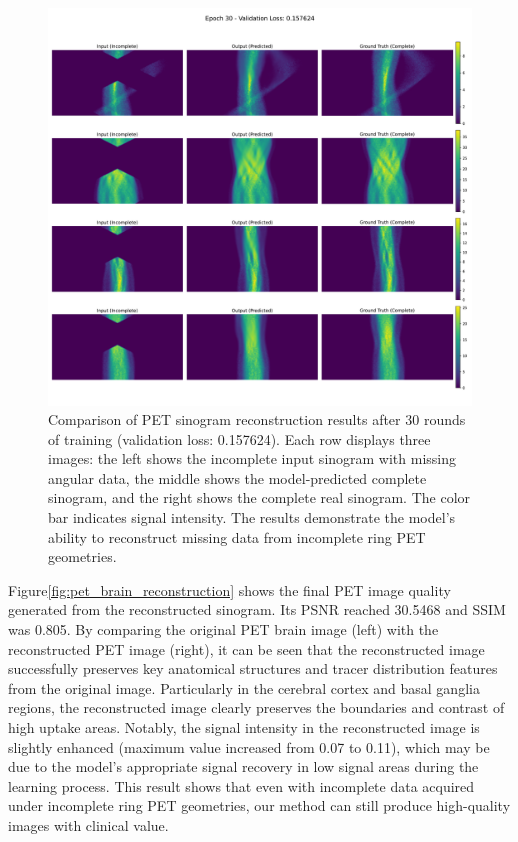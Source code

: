 \documentclass[
reprint,
superscriptaddress,
nofootinbib,
amsmath,amssymb,
aps,
prd,
]{revtex4-2}
\begin{document}
\begin{figure}[ht]
    \centering
    \includegraphics[width=\textwidth]{Images/epoch_030.pdf}
    \vspace{-1cm}
    \caption{Comparison of PET sinogram reconstruction results after 30 rounds of training (validation loss: 0.157624). Each row displays three images: the left shows the incomplete input sinogram with missing angular data, the middle shows the model-predicted complete sinogram, and the right shows the complete real sinogram. The color bar indicates signal intensity. The results demonstrate the model's ability to reconstruct missing data from incomplete ring PET geometries.}
    \label{fig:pet_reconstruction_results}
\end{figure}
Figure\ref{fig:pet_brain_reconstruction} shows the final PET image quality generated from the reconstructed sinogram. Its PSNR reached 30.5468 and SSIM was 0.805. By comparing the original PET brain image (left) with the reconstructed PET image (right), it can be seen that the reconstructed image successfully preserves key anatomical structures and tracer distribution features from the original image. Particularly in the cerebral cortex and basal ganglia regions, the reconstructed image clearly preserves the boundaries and contrast of high uptake areas. Notably, the signal intensity in the reconstructed image is slightly enhanced (maximum value increased from 0.07 to 0.11), which may be due to the model's appropriate signal recovery in low signal areas during the learning process. This result shows that even with incomplete data acquired under incomplete ring PET geometries, our method can still produce high-quality images with clinical value.
\end{document}
